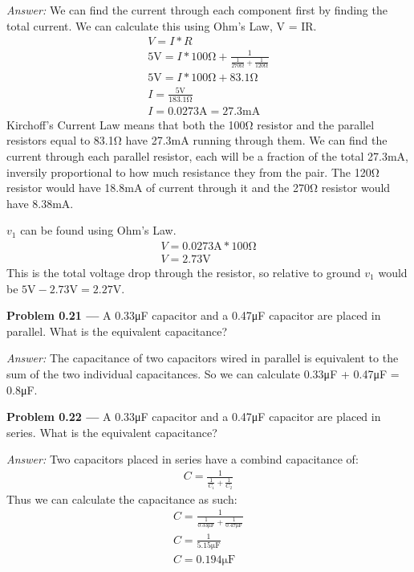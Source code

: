 \documentclass[11pt]{article}
\newcommand{\problem}[1]{\textbf{Problem #1 ---} }
\newcommand{\answer}{\textit{Answer: } }
\begin{document}
\answer We can find the current through each component first by finding the total current.
We can calculate this using Ohm's Law, V = IR.
\begin{align*}
V = I * R\\
5\si{\volt} = I * 100\si{\ohm} + \frac{1}{\frac{1}{270\si{\ohm}} + \frac{1}{120\si{\ohm}}}\\
5\si{\volt} = I * 100\si{\ohm} + 83.1\si{\ohm}\\
I = \frac{5\si{\volt}}{183.1\si{\ohm}}\\
I = 0.0273\si{\ampere} = 27.3\si{\milli\ampere}
\end{align*}
Kirchoff's Current Law means that both the 100\si{\ohm} resistor and the parallel resistors equal to 83.1\si{\ohm} have 27.3\si{\milli\ampere} running through them.
We can find the current through each parallel resistor, each will be a fraction of the total 27.3\si{\milli\ampere}, inversily proportional to how much resistance they from the pair.
The 120\si{\ohm} resistor would have 18.8\si{\milli\ampere} of current through it and the 270\si{\ohm} resistor would have 8.38\si{\milli\ampere}.

$v_1$ can be found using Ohm's Law.
\begin{align*}
V = 0.0273\si{\ampere} * 100\si{\ohm}\\
V = 2.73\si{\volt}
\end{align*}
This is the total voltage drop through the resistor, so relative to ground $v_1$ would be $5\si{\volt} - 2.73\si{\volt} = 2.27\si{\volt}$.

\problem{0.21} A 0.33\si{\micro\farad} capacitor and a 0.47\si{\micro\farad} capacitor are placed in parallel.  What is the
equivalent capacitance?

\answer The capacitance of two capacitors wired in parallel is equivalent to the sum of the two individual capacitances.
So we can calculate 0.33\si{\micro\farad} + 0.47\si{\micro\farad} = 0.8\si{\micro\farad}.

\problem{0.22}  A 0.33\si{\micro\farad} capacitor and a
  0.47\si{\micro\farad} capacitor are placed in series.  What is the
  equivalent capacitance?

\answer Two capacitors placed in series have a combind capacitance of:
\begin{align*}
C = \frac{1}{\frac{1}{C_1}+\frac{1}{C_2}}
\end{align*}
Thus we can calculate the capacitance as such:
\begin{align*}
C = \frac{1}{\frac{1}{0.33\si{\micro\farad}}+\frac{1}{0.47\si{\micro\farad}}}\\
C = \frac{1}{5.15\si{\micro\farad}}\\
C = 0.194\si{\micro\farad}
\end{align*}
\end{document}
